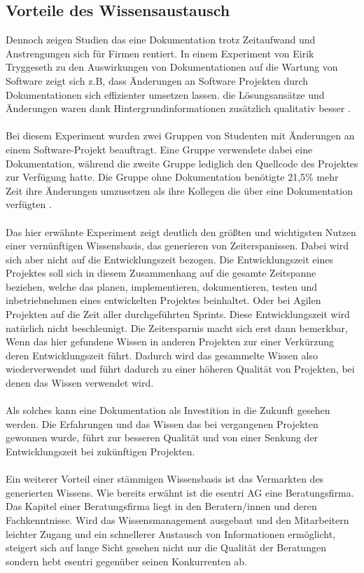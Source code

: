 \documentclass[a4paper,12pt]{scrartcl}
\begin{document}
\subsection{Vorteile des Wissensaustausch}
Dennoch zeigen Studien das eine Dokumentation trotz Zeitaufwand und Anstrengungen sich für Firmen rentiert. In einem Experiment von Eirik Tryggeseth zu den Auswirkungen von Dokumentationen auf die Wartung von Software zeigt sich z.B, dass Änderungen an Software Projekten durch Dokumentationen sich effizienter umsetzen lassen. die Lösungsansätze und Änderungen waren dank Hintergrundinformationen zusätzlich qualitativ besser \cite{Tryggeseth1997}.
\\\\
Bei diesem Experiment wurden zwei Gruppen von Studenten mit Änderungen an einem Software-Projekt beauftragt. Eine Gruppe verwendete dabei eine Dokumentation, während die zweite Gruppe lediglich den Quellcode des Projektes zur Verfügung hatte. Die Gruppe ohne Dokumentation benötigte 21,5\% mehr Zeit ihre Änderungen umzusetzen als ihre Kollegen die über eine Dokumentation verfügten \cite{Tryggeseth1997}.
\\\\
Das hier erwähnte Experiment zeigt deutlich den größten und wichtigsten Nutzen einer vernünftigen Wissensbasis, das generieren von Zeiterspanissen. Dabei wird sich aber nicht auf die Entwicklungszeit bezogen. Die Entwicklungszeit eines Projektes soll sich in diesem Zusammenhang auf die gesamte Zeitspanne beziehen, welche das planen, implementieren, dokumentieren, testen und inbetriebnehmen eines entwickelten Projektes beinhaltet. Oder bei Agilen Projekten auf die Zeit aller durchgeführten Sprints. Diese Entwicklungszeit wird natürlich nicht beschleunigt. Die Zeitersparnis macht sich erst dann bemerkbar, Wenn das hier gefundene Wissen in anderen Projekten zur einer Verkürzung deren Entwicklungszeit führt. Dadurch wird das gesammelte Wissen also wiederverwendet und führt dadurch zu einer höheren Qualität von Projekten, bei denen das Wissen verwendet wird.
\\\\
Als solches kann eine Dokumentation als Investition in die Zukunft gesehen werden. Die Erfahrungen und das Wissen das bei vergangenen Projekten gewonnen wurde, führt zur besseren Qualität und von einer Senkung der Entwicklungszeit bei zukünftigen Projekten.
\\\\
Ein weiterer Vorteil einer stämmigen Wissensbasis ist das Vermarkten des generierten Wissens. Wie bereits erwähnt ist die esentri AG eine Beratungsfirma. Das Kapitel einer Beratungsfirma liegt in den Beratern/innen und deren Fachkenntnisse. Wird das Wissensmanagement ausgebaut und den Mitarbeitern leichter Zugang und ein schnellerer Austausch von Informationen ermöglicht, steigert sich auf lange Sicht gesehen nicht nur die Qualität der Beratungen sondern hebt esentri gegenüber seinen Konkurrenten ab.
\end{document}
